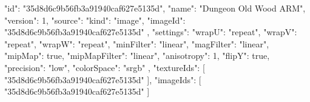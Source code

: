{
  "id": "35d8d6c9b56fb3a91940caf627e5135d",
  "name": "Dungeon Old Wood ARM",
  "version": 1,
  "source": {
    "kind": "image",
    "imageId": "35d8d6c9b56fb3a91940caf627e5135d"
  },
  "settings": {
    "wrapU": "repeat",
    "wrapV": "repeat",
    "wrapW": "repeat",
    "minFilter": "linear",
    "magFilter": "linear",
    "mipMap": true,
    "mipMapFilter": "linear",
    "anisotropy": 1,
    "flipY": true,
    "precision": "low",
    "colorSpace": "srgb"
  },
  "textureIds": [
    "35d8d6c9b56fb3a91940caf627e5135d"
  ],
  "imageIds": [
    "35d8d6c9b56fb3a91940caf627e5135d"
  ]
}
